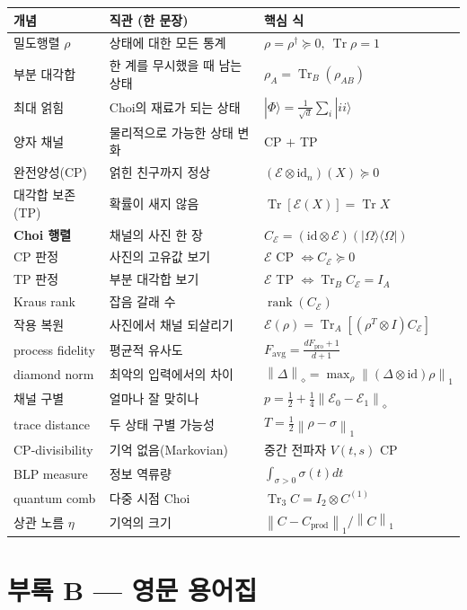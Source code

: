 \documentclass[11pt,a4paper]{article}
\newcommand{\E}{\mathcal{E}}
\newcommand{\Tr}{\operatorname{Tr}}
\newcommand{\id}{\mathrm{id}}
\newcommand{\diamondnorm}[1]{\left\lVert #1 \right\rVert_{\diamond}}
\newcommand{\onenorm}[1]{\left\lVert #1 \right\rVert_{1}}
\newcommand{\rank}{\operatorname{rank}}
\theoremstyle{definition}
\theoremstyle{plain}
\theoremstyle{remark}
\begin{document}
\begin{longtable}{p{}p{}p{}}
\toprule
개념 & 직관 (한 문장) & 핵심 식 \\
\midrule
\endhead
밀도행렬 $\rho$ & 상태에 대한 모든 통계 & $\rho=\rho^\dagger\succeq0,\ \Tr\rho=1$ \\
부분 대각합 & 한 계를 무시했을 때 남는 상태 & $\rho_A=\Tr_B(\rho_{AB})$ \\
최대 얽힘 & Choi의 재료가 되는 상태 & $|\Phi\rangle=\tfrac1{\sqrt d}\sum_i|ii\rangle$ \\
양자 채널 & 물리적으로 가능한 상태 변화 & CP $+$ TP \\
완전양성(CP) & 얽힌 친구까지 정상 & $(\E\otimes\id_n)(X)\succeq0$ \\
대각합 보존(TP) & 확률이 새지 않음 & $\Tr[\E(X)]=\Tr X$ \\
\textbf{Choi 행렬} & 채널의 사진 한 장 & $C_\E=(\id\otimes\E)(|\Omega\rangle\langle\Omega|)$ \\
CP 판정 & 사진의 고유값 보기 & $\E$ CP $\iff C_\E\succeq0$ \\
TP 판정 & 부분 대각합 보기 & $\E$ TP $\iff\Tr_B C_\E=I_A$ \\
Kraus rank & 잡음 갈래 수 & $\rank(C_\E)$ \\
작용 복원 & 사진에서 채널 되살리기 & $\E(\rho)=\Tr_A[(\rho^T\otimes I)C_\E]$ \\
process fidelity & 평균적 유사도 & $F_{\mathrm{avg}}=\frac{dF_{\mathrm{pro}}+1}{d+1}$ \\
diamond norm & 최악의 입력에서의 차이 & $\diamondnorm{\Delta}=\max_\rho\onenorm{(\Delta\otimes\id)\rho}$ \\
채널 구별 & 얼마나 잘 맞히나 & $p=\tfrac12+\tfrac14\diamondnorm{\E_0-\E_1}$ \\
trace distance & 두 상태 구별 가능성 & $T=\tfrac12\onenorm{\rho-\sigma}$ \\
CP-divisibility & 기억 없음(Markovian) & 중간 전파자 $V(t,s)$ CP \\
BLP measure & 정보 역류량 & $\int_{\sigma>0}\sigma(t)dt$ \\
quantum comb & 다중 시점 Choi & $\Tr_3 C=I_2\otimes C^{(1)}$ \\
상관 노름 $\eta$ & 기억의 크기 & $\onenorm{C-C_{\mathrm{prod}}}/\onenorm{C}$ \\
\bottomrule
\end{longtable}

\section{부록 B --- 영문 용어집}
\end{document}

